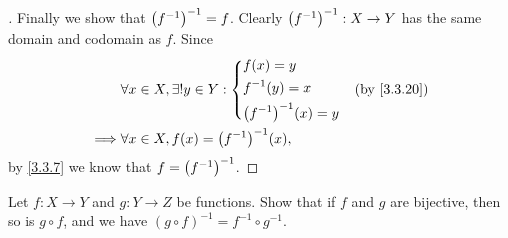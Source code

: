 \begin{proof}[]
  Finally we show that \(\left\lparen f^{-1}\right\rparen^{-1} = f\).
  Clearly \(\left\lparen f^{-1}\right\rparen^{-1} : X \to Y\) has the same domain and codomain as \(f\).
  Since
  \begin{align*}
             & \forall x \in X, \exists! y \in Y : \begin{dcases}
                                                     f(x) = y      \\
                                                     f^{-1}(y) = x \\
                                                     \pa{f^{-1}}^{-1}(x) = y
                                                   \end{dcases} &  & \by{3.3.20} \\
    \implies & \forall x \in X, f(x) = \pa{f^{-1}}^{-1}(x),
  \end{align*}
  by \cref{3.3.7} we know that \(f = \left\lparen f^{-1}\right\rparen^{-1}\).
\end{proof}

\begin{ex}\label{ex:3.3.7}
  Let \(f : X \to Y\) and \(g : Y \to Z\) be functions.
  Show that if \(f\) and \(g\) are bijective, then so is \(g \circ f\), and we have \((g \circ f)^{-1} = f^{-1} \circ g^{-1}\).
\end{ex}

